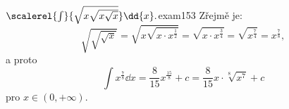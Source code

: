 \begin{mathexam}{\(\scalerel{\int}{\sqrt{x\sqrt{x\sqrt{x}}}}\dd{x}.\)}{exam153} 
  Zřejmě je: 
  \[
    \sqrt{\sqrt{\sqrt{x}}} = \sqrt{{x}\sqrt{x\cdot x^{\frac{1}{2}}}} = \sqrt{x\cdot x^{\frac{3}{4}}}
      = \sqrt{x^\frac{7}{4}} = x^{\frac{7}{8}},
  \]
  a proto
  \[
    \int x^{\frac{7}{8}}\dd{x} = \frac{8}{15}x^{\frac{15}{8}} + c 
      = \frac{8}{15}x\cdot\sqrt[8]{x^7} + c
  \]
  pro \(x\in(0,+\infty)\).
\end{mathexam}
